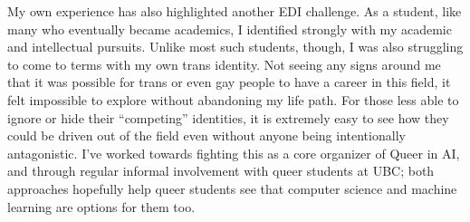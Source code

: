 \documentclass[12pt]{article}
\begin{document}
My own experience has also highlighted another EDI challenge.
As a student, like many who eventually became academics, I identified strongly with my academic and intellectual pursuits.
Unlike most such students, though, I was also struggling to come to terms with my own trans identity.
Not seeing any signs around me that it was possible for trans or even gay people to have a career in this field, it felt impossible to explore without abandoning my life path.
For those less able to ignore or hide their ``competing'' identities, it is extremely easy to see how they could be driven out of the field even without anyone being intentionally antagonistic.
I've worked towards fighting this as a core organizer of Queer in AI, and through regular informal involvement with queer students at UBC; both approaches hopefully help queer students see that computer science and machine learning are options for them too.
\end{document}

